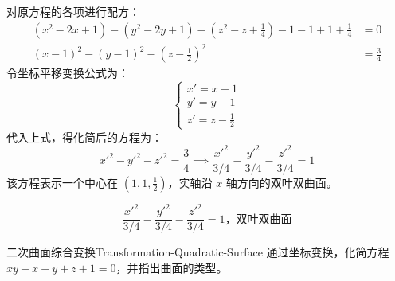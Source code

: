 \begin{solution}
    对原方程的各项进行配方：
    \begin{equation*}
        \begin{aligned}
            (x^2 - 2x + 1) - (y^2 - 2y + 1) - \left( z^2 - z + \frac{1}{4} \right) - 1 - 1 + 1 + \frac{1}{4} & = 0           \\
            (x - 1)^2 - (y - 1)^2 - \left( z - \frac{1}{2} \right)^2                                         & = \frac{3}{4}
        \end{aligned}
    \end{equation*}
    令坐标平移变换公式为：
    \begin{equation*}
        \begin{cases}
            x' = x - 1 \\
            y' = y - 1 \\
            z' = z - \frac{1}{2}
        \end{cases}
    \end{equation*}
    代入上式，得化简后的方程为：
    \begin{equation*}
        x'^2 - y'^2 - z'^2 = \frac{3}{4} \implies \frac{x'^2}{3/4} - \frac{y'^2}{3/4} - \frac{z'^2}{3/4} = 1
    \end{equation*}
    该方程表示一个中心在 $\left( 1, 1, \frac{1}{2} \right)$，实轴沿 $x$ 轴方向的双叶双曲面。

    \begin{equation*}
        \boxed{\frac{x'^2}{3/4} - \frac{y'^2}{3/4} - \frac{z'^2}{3/4} = 1，\text{双叶双曲面}}
    \end{equation*}
\end{solution}

\begin{problem}{二次曲面综合变换}{Transformation-Quadratic-Surface}
    通过坐标变换，化简方程 $xy - x + y + z + 1 = 0$，并指出曲面的类型。
\end{problem}

